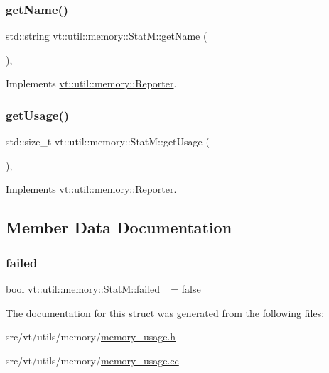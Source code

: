 \subsubsection{\texorpdfstring{get\+Name()}{getName()}}
{\footnotesize\ttfamily std\+::string vt\+::util\+::memory\+::\+Stat\+M\+::get\+Name (\begin{DoxyParamCaption}{ }\end{DoxyParamCaption})\hspace{0.3cm}{\ttfamily [override]}, {\ttfamily [virtual]}}



Implements \hyperlink{structvt_1_1util_1_1memory_1_1_reporter_a83fc36e9cff3ce2deedf1d4546694713}{vt\+::util\+::memory\+::\+Reporter}.

\mbox{\label{structvt_1_1util_1_1memory_1_1_stat_m_a066c740a52e05e7184dfff530ed07173}} 
\subsubsection{\texorpdfstring{get\+Usage()}{getUsage()}}
{\footnotesize\ttfamily std\+::size\+\_\+t vt\+::util\+::memory\+::\+Stat\+M\+::get\+Usage (\begin{DoxyParamCaption}{ }\end{DoxyParamCaption})\hspace{0.3cm}{\ttfamily [override]}, {\ttfamily [virtual]}}



Implements \hyperlink{structvt_1_1util_1_1memory_1_1_reporter_a372574f51fdb68077cd3d227ee373de5}{vt\+::util\+::memory\+::\+Reporter}.



\subsection{Member Data Documentation}
\mbox{\label{structvt_1_1util_1_1memory_1_1_stat_m_a9c268c769506493be2a98ea4e6e553ff}} 
\subsubsection{\texorpdfstring{failed\+\_\+}{failed\_}}
{\footnotesize\ttfamily bool vt\+::util\+::memory\+::\+Stat\+M\+::failed\+\_\+ = false\hspace{0.3cm}{\ttfamily [private]}}



The documentation for this struct was generated from the following files\+:\begin{DoxyCompactItemize}
\item 
src/vt/utils/memory/\hyperlink{memory__usage_8h}{memory\+\_\+usage.\+h}\item 
src/vt/utils/memory/\hyperlink{memory__usage_8cc}{memory\+\_\+usage.\+cc}\end{DoxyCompactItemize}
